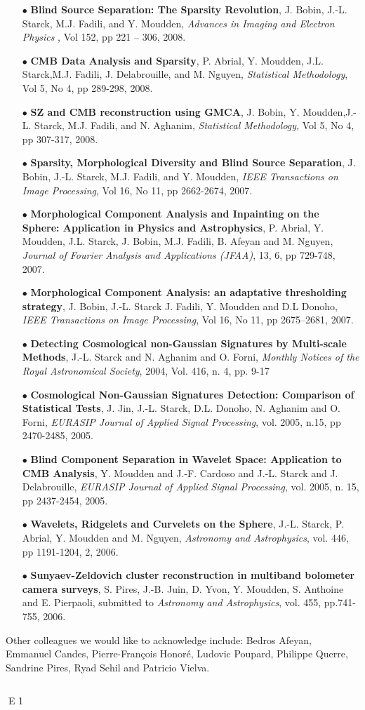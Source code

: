 \begin{itemize}
\item[$\bullet$] {\textbf{Blind Source Separation: The Sparsity Revolution}, J. Bobin, J.-L. Starck, M.J. Fadili, and Y. Moudden, \textit{Advances in Imaging and Electron Physics }, Vol 152, pp 221 -- 306, 2008.}
\item[$\bullet$] {\textbf{CMB Data Analysis and Sparsity}, P. Abrial, Y. Moudden, J.L. Starck,M.J. Fadili, J. Delabrouille, and M. Nguyen, \textit{Statistical Methodology}, Vol 5, No 4, pp 289-298, 2008.}
\item[$\bullet$] {\textbf{SZ and CMB reconstruction using GMCA}, J. Bobin, Y. Moudden,J.-L. Starck, M.J. Fadili, and N. Aghanim, \textit{Statistical Methodology}, Vol 5, No 4, pp 307-317, 2008.}
\item[$\bullet$] {\textbf{Sparsity, Morphological Diversity and Blind Source Separation}, J. Bobin, J.-L. Starck, M.J. Fadili, and Y. Moudden, \textit{IEEE Transactions on Image Processing}, Vol 16, No 11, pp 2662-2674, 2007.}
\item[$\bullet$] {\textbf{Morphological Component Analysis and Inpainting on the Sphere: Application in Physics and Astrophysics}, P. Abrial, Y. Moudden, J.L. Starck, J. Bobin, M.J. Fadili, B. Afeyan and M. Nguyen,  \textit{Journal of Fourier Analysis and Applications (JFAA)}, 13, 6, pp 729-748, 2007.}
\item[$\bullet$] {\textbf{Morphological Component Analysis: an adaptative thresholding strategy}, J. Bobin, J.-L. Starck J. Fadili, Y. Moudden and D.L Donoho, \textit{IEEE Transactions on Image Processing}, Vol 16, No 11, pp 2675--2681, 2007.}
\item[$\bullet$] {\textbf{Detecting Cosmological non-Gaussian Signatures by Multi-scale Methods}, J.-L. Starck and N. Aghanim and O. Forni, \textit{Monthly Notices of the Royal Astronomical Society}, 2004, Vol. 416, n. 4, pp. 9-17}
\item[$\bullet$] {\textbf{Cosmological Non-Gaussian Signatures Detection: Comparison of Statistical Tests}, J. Jin, J.-L. Starck, D.L. Donoho, N. Aghanim and O. Forni, \textit{EURASIP Journal of Applied Signal Processing}, vol. 2005, n.15, pp 2470-2485, 2005.}
\item[$\bullet$] {\textbf{Blind Component Separation in Wavelet Space: Application to {CMB} Analysis}, Y. Moudden and J.-F. Cardoso and J.-L. Starck and J. Delabrouille, \textit{EURASIP Journal of Applied Signal Processing}, vol. 2005, n. 15, pp 2437-2454, 2005.}
\item[$\bullet$] {\textbf{Wavelets, Ridgelets and Curvelets on the Sphere}, J.-L. Starck, P. Abrial, Y. Moudden and M. Nguyen, \textit{Astronomy and Astrophysics}, vol. 446, pp 1191-1204, 2, 2006.}
\item[$\bullet$] {\textbf{Sunyaev-Zeldovich cluster reconstruction in multiband bolometer camera surveys}, S. Pires, J.-B. Juin, D. Yvon, Y. Moudden, S. Anthoine and E. Pierpaoli, submitted to \textit{Astronomy and Astrophysics}, vol. 455,  pp.741-755, 2006.}
\end{itemize}
Other colleagues we would like to acknowledge include:
Bedros Afeyan, Emmanuel Candes, Pierre-Fran{\c{c}}ois Honor\'e, Ludovic Poupard, Philippe Querre, Sandrine Pires, Ryad Sehil and Patricio Vielva.

\newpage
\thispagestyle{empty}
$ $
\newpage


E 1
